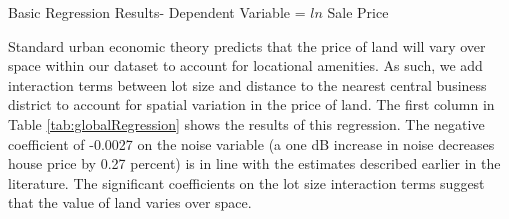 \documentclass{article}\usepackage{graphicx, color}
\begin{document}
\begin{table}
\caption{Basic Regression Results- Dependent Variable = $ln$ Sale Price}\label{tab:globalRegression}

\end{table}

Standard urban economic theory \citep{Alonso1964, Mills1967, Muth1969} predicts that the price of land will vary over space within our dataset to account for locational amenities. As such, we add interaction terms between lot size and distance to the nearest central business district to account for spatial variation in the price of land. The first column in Table \ref{tab:globalRegression} shows the results of this regression. The negative coefficient of -0.0027 on the noise variable (a one dB increase in noise decreases house price by 0.27 percent) is in line with the estimates described earlier in the literature. The significant coefficients on the lot size interaction terms suggest that the value of land varies over space. 
\end{document}
